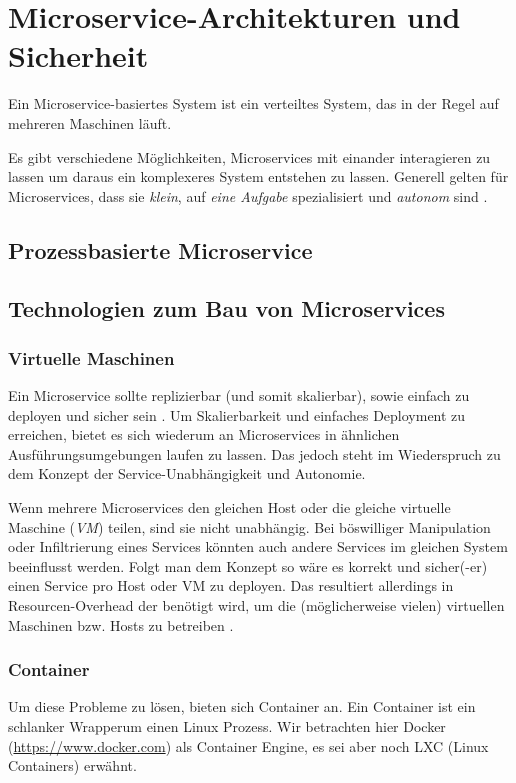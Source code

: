 \section{Microservice-Architekturen und Sicherheit}

Ein Microservice-basiertes System ist ein verteiltes System, das in der Regel auf mehreren Maschinen läuft. 

Es gibt verschiedene Möglichkeiten, Microservices mit einander interagieren zu lassen um daraus ein komplexeres System entstehen zu lassen. Generell gelten für Microservices, dass sie \textit{klein}, auf \textit{eine Aufgabe} spezialisiert und \textit{autonom} sind \cite{newman2015building}. 


\subsection{Prozessbasierte Microservice}

\subsection{Technologien zum Bau von Microservices}

\subsubsection{Virtuelle Maschinen}

Ein Microservice sollte replizierbar (und somit skalierbar), sowie einfach zu deployen und sicher sein \cite{newman2015building,microservicesIO}. Um Skalierbarkeit und einfaches Deployment zu erreichen, bietet es sich wiederum an Microservices in ähnlichen Ausführungsumgebungen laufen zu lassen. Das jedoch steht im Wiederspruch zu dem Konzept der Service-Unabhängigkeit und Autonomie. 

Wenn mehrere Microservices den gleichen Host oder die gleiche virtuelle Maschine (\textit{VM}) teilen, sind sie nicht unabhängig. Bei böswilliger Manipulation oder Infiltrierung eines Services könnten auch andere Services im gleichen System beeinflusst werden. Folgt man dem Konzept so wäre es korrekt und sicher(-er) einen Service pro Host oder VM zu deployen. Das resultiert allerdings in Resourcen-Overhead der benötigt wird, um die (möglicherweise vielen) virtuellen Maschinen bzw. Hosts zu betreiben \cite{microservicesIO}.

\subsubsection{Container}
Um diese Probleme zu lösen, bieten sich Container an. Ein Container ist ein schlanker \glqq Wrapper\grqq um einen Linux Prozess. Wir betrachten hier Docker (\url{https://www.docker.com}) als Container Engine, es sei aber noch LXC (Linux Containers) erwähnt.

